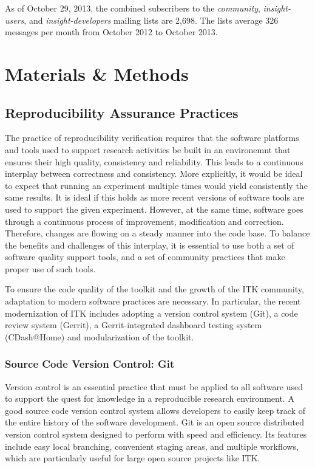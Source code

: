\documentclass{frontiersENG} %
\begin{document}
As of October 29, 2013, the combined subscribers to the \textit{community},
\textit{insight-users}, and \textit{insight-developers} mailing lists are 2,698.
The lists average 326 messages per month from October 2012 to October 2013.


\section{Materials \& Methods}

\subsection{Reproducibility Assurance Practices}

The practice of reproducibility verification requires that the software
platforms and tools used to support research activities be built in an
environemnt that ensures their high quality, consistency and reliability. This
leads to a continuous interplay between correctness and consistency. More
explicitly, it would be ideal to expect that running an experiment multiple times
would yield consistently the same results. It is ideal if this holds as more
recent versions of software tools are used to support the given experiment.
However, at the same time, software goes through a continuous process of
improvement, modification and correction. Therefore, changes are flowing on a
steady manner into the code base. To balance the benefits and challenges of
this interplay, it is essential to use both a set of software quality support
tools, and a set of community practices that make proper use of such tools.

To ensure the code quality of the toolkit and the growth of the ITK community,
adaptation to modern software practices are necessary. In particular, the
recent modernization of ITK includes adopting a version control system (Git),
 a code review system (Gerrit), a Gerrit-integrated dashboard testing system
(CDash@Home) and modularization of the toolkit.

\subsubsection{Source Code Version Control: Git} Version control is an
essential practice that must be applied to all software used to support the
quest for knowledge in a reproducible research environment. A good source code
version control system allows developers to easily keep track of the entire
history of the software development. Git is an open source distributed version
control system designed to perform with speed and efficiency. Its features
include easy local branching, convenient staging areas, and multiple workflows,
which are particularly useful for large open source projects like ITK.
\end{document}
